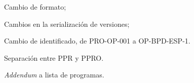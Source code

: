 \begin{changelog}[simple, sectioncmd=\subsection*,label=changelog-1.2]
	\begin{version}[v=2.1, date=2023--01, author=Pablo E. Alanis]
			\item Cambio de formato;
			\item Cambios en la serialización de versiones;
			\item Cambio de identificado, de PRO-OP-001 a OP-BPD-ESP-1.
			\item Separación entre \gls{PPR} y \gls{PPRO}.
	\end{version}

	\begin{version}[v=1.9, date=2022--05, author=Alonso M.]
		\item \textit{Addendum} a lista de programas.
	\end{version}
\end{changelog}